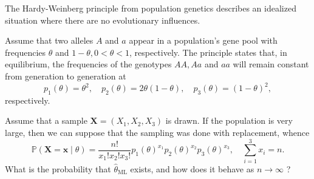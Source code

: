 \begin{ex}
    The Hardy-Weinberg principle from population genetics describes an idealized situation where there are no evolutionary influences. 
    
    Assume that two alleles \(A\) and \(a\) appear in a population's gene pool with frequencies \(\theta\) and \(1-\theta, 0<\theta<1\), respectively. The principle states that, in equilibrium, the frequencies of the genotypes \(A A, A a\) and \(a a\) will remain constant from generation to generation at
    \[
    p_{1}(\theta)=\theta^{2}, \quad p_{2}(\theta)=2 \theta(1-\theta), \quad p_{3}(\theta)=(1-\theta)^{2},
    \]
    respectively.
    
    Assume that a sample \(\mathbf{X}=\left(X_{1}, X_{2}, X_{3}\right)\) is drawn. If the population is very large, then we can suppose that the sampling was done with replacement, whence
    \[
    \mathbb{P}(\mathbf{X}=\mathbf{x} \mid \theta)=\frac{n !}{x_{1} ! x_{2} ! x_{3} !} p_{1}(\theta)^{x_{1}} p_{2}(\theta)^{x_{2}} p_{3}(\theta)^{x_{3}}, \quad \sum_{i=1}^{3} x_{i}=n .
    \]
    What is the probability that \(\widehat{\theta}_{\mathrm{ML}}\) exists, and how does it behave as \(n \rightarrow \infty\) ?
\end{ex}



